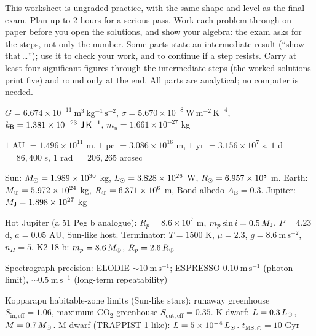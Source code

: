 
\ipsmaketitle

This worksheet is ungraded practice, with the same shape and level as the final exam.
Plan up to 2 hours for a serious pass.
Work each problem through on paper before you open the solutions, and show your algebra:
the exam asks for the steps, not only the number.
Some parts state an intermediate result (``show that\,\ldots''); use it to check your work, and to continue if a step resists.
Carry at least four significant figures through the intermediate steps (the worked solutions print five) and round only at the end.
All parts are analytical; no computer is needed.

\begin{given}
$G = 6.674 \times 10^{-11}\ \mathrm{m^3\,kg^{-1}\,s^{-2}}$,\quad
$\sigma = 5.670 \times 10^{-8}\ \mathrm{W\,m^{-2}\,K^{-4}}$,\quad
$\kB = 1.381 \times 10^{-23}\ \mathrm{J\,K^{-1}}$,\quad
$m_u = 1.661 \times 10^{-27}$ kg

\vskip4pt
$1$ AU $= 1.496 \times 10^{11}$ m,\quad
$1$ pc $= 3.086 \times 10^{16}$ m,\quad
$1$ yr $= 3.156 \times 10^{7}$ s,\quad
$1$ d $= 86{,}400$ s,\quad
$1$ rad $= 206{,}265$ arcsec

\vskip4pt
Sun: $M_{\odot} = 1.989 \times 10^{30}$ kg, $L_{\odot} = 3.828 \times 10^{26}$ W, $R_{\odot} = 6.957 \times 10^{8}$ m.\quad
Earth: $M_{\oplus} = 5.972 \times 10^{24}$ kg, $R_{\oplus} = 6.371 \times 10^{6}$ m, Bond albedo $A_\mathrm{B} = 0.3$.\quad
Jupiter: $M_{\mathsf{J}} = 1.898 \times 10^{27}$ kg

\vskip4pt
Hot Jupiter (a 51 Peg b analogue): $R_p = 8.6 \times 10^{7}$ m, $m_p \sin i = 0.5\,M_{\mathsf{J}}$, $P = 4.23$ d, $a = 0.05$ AU, Sun-like host. Terminator: $T = 1500$ K, $\mu = 2.3$, $g = 8.6\ \mathrm{m\,s^{-2}}$, $n_H = 5$.\quad
K2-18 b: $m_p = 8.6\,M_{\oplus}$, $R_p = 2.6\,R_{\oplus}$

\vskip4pt
Spectrograph precision: ELODIE $\sim 10\ \mathrm{m\,s^{-1}}$; ESPRESSO $0.10\ \mathrm{m\,s^{-1}}$ (photon limit), $\sim 0.5\ \mathrm{m\,s^{-1}}$ (long-term repeatability)

\vskip4pt
Kopparapu habitable-zone limits (Sun-like stars): runaway greenhouse $S_\mathrm{in,eff} = 1.06$, maximum $\mathrm{CO_2}$ greenhouse $S_\mathrm{out,eff} = 0.35$.\quad
K dwarf: $L = 0.3\,L_{\odot}$, $M = 0.7\,M_{\odot}$.\quad
M dwarf (TRAPPIST-1-like): $L = 5 \times 10^{-4}\,L_{\odot}$.\quad
$t_\mathrm{MS,\odot} = 10$ Gyr

\end{given}



